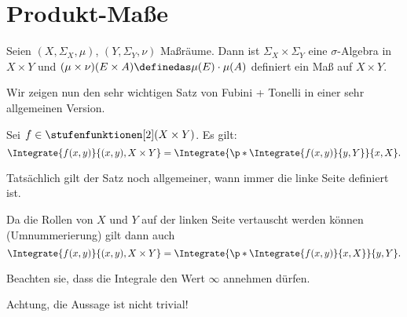 \section{Produkt-Maße}
Seien \( (X,\Sigma_X,\mu) \), \( (Y,\Sigma_Y,\nu) \) Maßräume. Dann ist \( \Sigma_X \times \Sigma_Y \) eine \( \sigma \)-Algebra in \( X\times Y \) und \( (\mu\times \nu)(E\times A)\definedas \mu(E)\cdot \mu(A) \) definiert ein Maß auf \( X\times Y \).

Wir zeigen nun den sehr wichtigen Satz von Fubini + Tonelli in einer sehr allgemeinen Version.
\begin{satz}[Fubini]\label{fubini}
  Sei \( f\in \stufenfunktionen[2](X\times Y) \). Es gilt:
  \begin{equation*}
    \Integrate{f(x,y)}{{(x,y)},{X\times Y}}=\Integrate{\p*{\Integrate{f(x,y)}{y,Y}}}{x,X}.
  \end{equation*}
\end{satz}
\begin{bemerkung*}
  Tatsächlich gilt der Satz noch allgemeiner, wann immer die linke Seite definiert ist.
\end{bemerkung*}
\begin{bemerkung*}
  Da die Rollen von \( X \) und \( Y \) auf der linken Seite vertauscht werden können (Umnummerierung) gilt dann auch
  \begin{equation*}
    \Integrate{f(x,y)}{{(x,y)},{X\times Y}}=\Integrate{\p*{\Integrate{f(x,y)}{x,X}}}{y,Y}.
  \end{equation*}
\end{bemerkung*}
\begin{bemerkung*}
  Beachten sie, dass die Integrale den Wert \( \infty \) annehmen dürfen.
\end{bemerkung*}
Achtung, die Aussage ist nicht trivial!

